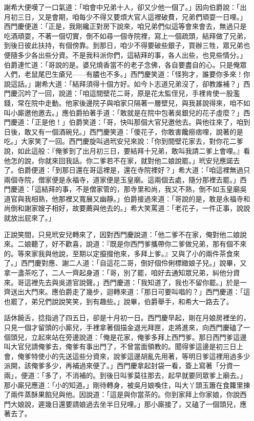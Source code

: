 謝希大便嘆了一口氣道：「咱會中兄弟十人，卻又少他一個了。」因向伯爵說：「出月初三日，又是會期，咱每少不得又要煩大官人這裡破費，兄弟們頑耍一日哩。」西門慶便道：「正是，我剛纔正對房下說來，咱兄弟們似這等會來會去，無過只是吃酒頑耍，不著一個切實，倒不如尋一個寺院裡，寫上一個疏頭，結拜做了兄弟，到後日彼此扶持，有個傍靠。到那日，咱少不得要破些銀子，買辦三牲，眾兄弟也便隨多少各出些分資。不是我科派你們，這結拜的事，各人出些，也見些情分。」伯爵連忙道：「哥說的是。婆兒燒香當不的老子念佛，各自要盡自的心。只是俺眾人們，老鼠尾巴生瘡兒——有膿也不多。」西門慶笑道：「怪狗才，誰要你多來！你說這話。」謝希大道：「結拜須得十個方好。如今卜志道兄弟沒了，卻教誰補？」西門慶沉吟了一回，說道：「咱這間壁花二哥，原是花太監侄兒，手裡肯使一股濫錢，常在院中走動。他家後邊院子與咱家只隔著一層壁兒，與我甚說得來，咱不如叫小廝邀他邀去。」應伯爵拍著手道：「敢就是在院中包著吳銀兒的花子虛麼？」西門慶道：「正是他！」伯爵笑道：「哥，快叫那個大官兒邀他去。與他往來了，咱到日後，敢又有一個酒碗兒。」西門慶笑道：「傻花子，你敢害饞癆痞哩，說著的是吃。」大家笑了一回。西門慶旋叫過玳安兒來說：「你到間壁花家去，對你花二爹說，如此這般：『俺爹到了出月初三日，要結拜十兄弟，敢叫我請二爹上會哩。』看他怎的說，你就來回我話。你二爹若不在家，就對他二娘說罷。」玳安兒應諾去了。伯爵便道：「到那日還在哥這裡是，還在寺院裡好？」希大道：「咱這裡無過只兩個寺院，僧家便是永福寺，道家便是玉皇廟。這兩個去處，隨分那裡去罷。」西門慶道：「這結拜的事，不是僧家管的，那寺里和尚，我又不熟，倒不如玉皇廟吳道官與我相熟，他那裡又寬展又幽靜。」伯爵接過來道：「哥說的是，敢是永福寺和尚倒和謝家嫂子相好，故要薦與他去的。」希大笑罵道：「老花子，一件正事，說說就放出屁來了。」

正說笑間，只見玳安兒轉來了，因對西門慶說道：「他二爹不在家，俺對他二娘說來。二娘聽了，好不歡喜，說道：『既是你西門爹攜帶你二爹做兄弟，那有個不來的。等來家我與他說，至期以定攛掇他來，多拜上爹。』又與了小的兩件茶食來了。」西門慶對應、謝二人道：「自這花二哥，倒好個伶俐標緻娘子兒。」說畢，又拿一盞茶吃了，二人一齊起身道：「哥，別了罷，咱好去通知眾兄弟，糾他分資來。哥這裡先去與吳道官說聲。」西門慶道：「我知道了，我也不留你罷。」於是一齊送出大門來。應伯爵走了幾步，迴轉來道：「那日可要叫唱的？」西門慶道：「這也罷了，弟兄們說說笑笑，到有趣些。」說畢，伯爵舉手，和希大一路去了。

話休饒舌，捻指過了四五日，卻是十月初一日。西門慶早起，剛在月娘房裡坐的，只見一個才留頭的小廝兒，手裡拿著個描金退光拜匣，走將進來，向西門慶磕了一個頭兒，立起來站在旁邊說道：「俺是花家，俺爹多拜上西門爹。那日西門爹這邊叫大官兒請俺爹去，俺爹有事出門了，不曾當面領教的。聞得爹這邊是初三日上會，俺爹特使小的先送這些分資來，說爹這邊胡亂先用著，等明日爹這裡用過多少派開，該俺爹多少，再補過來便了。」西門慶拿起封袋一看，簽上寫著「分資一兩」，便道：「多了，不消補的。到後日叫爹莫往那去，起早就要同眾爹上廟去。」那小廝兒應道：「小的知道。」剛待轉身，被吳月娘喚住，叫大丫頭玉簫在食籮里揀了兩件蒸酥果餡兒與他。因說道：「這是與你當茶的。你到家拜上你家娘，你說西門大娘說，遲幾日還要請娘過去坐半日兒哩。」那小廝接了，又磕了一個頭兒，應著去了。

